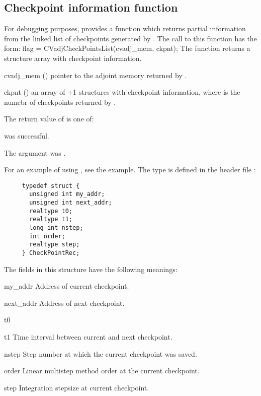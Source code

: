 \subsection{Checkpoint information function}
For debugging purposes, {\cvodes} provides a function  which
returns partial information from the linked list of checkpoints generated by
. The call to this function has the form:
{
  flag = CVadjCheckPointsList(cvadj\_mem, ckpnt);
}
{
  The function  returns a structure array
  with checkpoint information.
}
{  
  \begin{args}
  \item[cvadj\_mem] ()
    pointer to the adjoint memory returned by .
  \item[ckpnt] ()
    an array of +1 structures with checkpoint information, where
     is the numebr of checkpoints returned by .
  \end{args}
}
{
  The return value  of  is one of:
  \begin{args}
  \item[\Id{CV\_SUCCESS}] 
     was successful.
  \item[\Id{CV\_ADJMEM\_NULL}]
    The  argument was .
  \end{args}
}
{
  For an example of using , see the  
  example.
}
The type  is defined in the header file :
\begin{verbatim}
     typedef struct {
       unsigned int my_addr;
       unsigned int next_addr;
       realtype t0;
       realtype t1;
       long int nstep;
       int order;
       realtype step;
     } CheckPointRec;
\end{verbatim}
The fields in this structure have the following meanings:
\begin{args}
\item[my\_addr]
  Address of current checkpoint.
\item[next\_addr]
  Address of next checkpoint.
\item[t0]
\item[t1]
  Time interval between current and next checkpoint.
\item[nstep]
  Step number at which the current checkpoint was saved.
\item[order]
  Linear multistep method order at the current checkpoint.
\item[step]
  Integration stepsize at current checkpoint.
\end{args}
